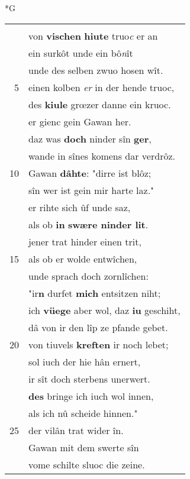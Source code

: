 \documentclass[8pt,a4paper,notitlepage]{article}
\begin{document}
\begin{table}[ht]
\begin{minipage}[t]{0.5\linewidth}
\small
\begin{center}*G
\end{center}
\begin{tabular}{rl}
 & \textbf{\begin{large}E\end{large}r} was \textbf{vreislîch} getân.\\ 
 & von \textbf{vischen} \textbf{hiute} truo\textit{c} er an\\ 
 & ein surkôt unde ein bô\textit{n}ît\\ 
 & unde des selben zwuo hosen wît.\\ 
5 & einen kolben \textit{er} in der hende truoc,\\ 
 & des \textbf{kiule} grœzer danne ein kruoc.\\ 
 & er gienc gein Gawan her.\\ 
 & daz was \textbf{doch} ninder sîn \textbf{ger},\\ 
 & wande in sînes komens dar verdrôz.\\ 
10 & Gawan \textbf{dâhte}: "dirre ist blôz;\\ 
 & sîn wer ist gein mir harte laz."\\ 
 & er rihte sich ûf unde saz,\\ 
 & als ob \textbf{in} \textbf{swære ninder lit}.\\ 
 & jener trat hinder einen trit,\\ 
15 & als ob er wolde entwîchen,\\ 
 & unde sprach doch zornlîchen:\\ 
 & "ir\textbf{n} durfet \textbf{mich} entsitzen niht;\\ 
 & ich \textbf{vüege} aber wol, daz \textbf{iu} geschiht,\\ 
 & dâ von ir den lîp ze pfande gebet.\\ 
20 & von tiuvels \textbf{kreften} ir noch lebet;\\ 
 & sol iuch der hie hân ernert,\\ 
 & ir sît doch sterbens unerwert.\\ 
 & \textbf{des} bringe ich iuch wol innen,\\ 
 & als ich nû scheide hinnen."\\ 
25 & der vilân trat wider în.\\ 
 & Gawan mit dem swerte sîn\\ 
 & vome schilte sluoc die zeine.\\ 

\end{tabular}
\end{minipage}
\end{table}
\end{document}
